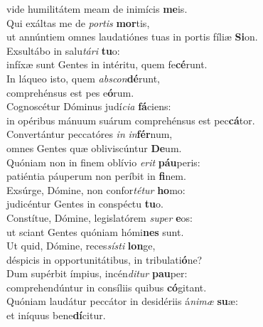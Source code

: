 \oddverse vide humilitátem meam de inimícis \textbf{me}is.\\
\evenverse Qui exáltas me de \textit{por}\textit{tis} \textbf{mor}tis,~\*\\
\evenverse ut annúntiem omnes laudatiónes tuas in portis fíliæ \textbf{Si}on.\\
\oddverse Exsultábo in salu\textit{tá}\textit{ri} \textbf{tu}o:~\*\\
\oddverse infíxæ sunt Gentes in intéritu, quem fe\textbf{cé}runt.\\
\evenverse In láqueo isto, quem \textit{ab}\textit{scon}\textbf{dé}runt,~\*\\
\evenverse comprehénsus est pes e\textbf{ó}rum.\\
\oddverse Cognoscétur Dóminus judí\textit{ci}\textit{a} \textbf{fá}ciens:~\*\\
\oddverse in opéribus mánuum suárum comprehénsus est pec\textbf{cá}tor.\\
\evenverse Convertántur peccatóres \textit{in} \textit{in}\textbf{fér}num,~\*\\
\evenverse omnes Gentes quæ obliviscúntur \textbf{De}um.\\
\oddverse Quóniam non in finem oblívio \textit{e}\textit{rit} \textbf{páu}peris:~\*\\
\oddverse patiéntia páuperum non períbit in \textbf{fi}nem.\\
\evenverse Exsúrge, Dómine, non confor\textit{té}\textit{tur} \textbf{ho}mo:~\*\\
\evenverse judicéntur Gentes in conspéctu \textbf{tu}o.\\
\oddverse Constítue, Dómine, legislatórem \textit{su}\textit{per} \textbf{e}os:~\*\\
\oddverse ut sciant Gentes quóniam hómi\textbf{nes} sunt.\\
\evenverse Ut quid, Dómine, reces\textit{sí}\textit{sti} \textbf{lon}ge,~\*\\
\evenverse déspicis in opportunitátibus, in tribulati\textbf{ó}ne?\\
\oddverse Dum supérbit ímpius, incén\textit{di}\textit{tur} \textbf{pau}per:~\*\\
\oddverse comprehendúntur in consíliis quibus \textbf{có}gitant.\\
\evenverse Quóniam laudátur peccátor in desidériis á\textit{ni}\textit{mæ} \textbf{su}æ:~\*\\
\evenverse et iníquus bene\textbf{dí}citur.\\
